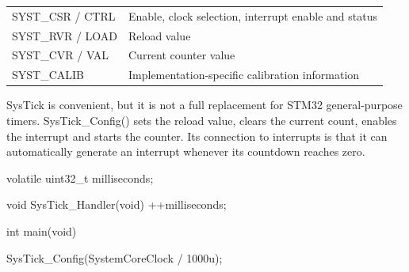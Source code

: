 \documentclass{report}
\begin{document}
\begin{itemize}
\begin{center}
\begin{tabularx}{\textwidth}{@{}XX@{}}
                    \midrule
                    SYST\_CSR / CTRL	&Enable, clock selection, interrupt enable and status\\[2ex]
                    SYST\_RVR / LOAD	&Reload value\\[2ex]
                    SYST\_CVR / VAL	&Current counter value\\[2ex]
                    SYST\_CALIB	&Implementation-specific calibration information \\
                    \bottomrule
                \end{tabularx}
            \end{center}
            \bigbreak \noindent 
            SysTick is convenient, but it is not a full replacement for STM32 general-purpose timers.
            \bigbreak \noindent 
            SysTick\_Config() sets the reload value, clears the current count, enables the interrupt and starts the counter.
            \bigbreak \noindent 
            Its connection to interrupts is that it can automatically generate an interrupt whenever its countdown reaches zero.
            \bigbreak \noindent 
            \begin{ccode}
                volatile uint32_t milliseconds;

                void SysTick_Handler(void)
                {
                    ++milliseconds;
                }

                int main(void)
                {
                    SysTick_Config(SystemCoreClock / 1000u);

}
\end{ccode}
\end{itemize}
\end{document}
